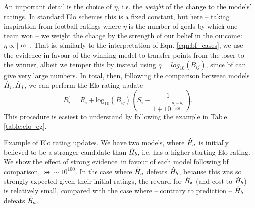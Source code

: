 An important detail is the choice of $\eta$, i.e. the \emph{weight} of the 
    change to the models' ratings. 
In standard Elo schemes this is a fixed constant, 
    but here -- taking inspiration from football ratings where $\eta$ is the number of goals 
    by which one team won -- we weight the change by the strength of our belief in the outcome: 
    $\eta \propto \left| \bij \right|$.
That is, similarly to the interpretation of Eqn. \ref{eqn:bf_cases}, 
    we use the evidence in favour of the winning model to transfer points from the loser to the winner,
    albeit we temper this by instead using $\eta = log_{10}(B_{ij})$, since \gls{bf} can give very large numbers. 
In total, then, following the comparison between models $\hat{H}_i, \hat{H}_j$, we can perform the Elo rating update
\begin{equation}
    \label{eqn:elo_update}
    R_i^{\prime} = R_i + \text{log}_{10}(B_{ij}) \left(S_i - \frac{1}{1 + 10^{\frac{R_j - R_i}{400}}}\right).
\end{equation}
This procedure is easiest to understand by following the example in Table \ref{table:elo_eg}. 

\begin{table}
    \centering
    
    \caption[Example of Elo rating updates.]{
        Example of Elo rating updates. 
        We have two models, where $\hat{H}_a$ is initially believed to be a stronger candidate than $\hat{H}_b$, 
            i.e. has a higher starting Elo rating.     
        We show the effect of strong evidence\footnotemark \ in favour of each model following \gls{bf} comparison, $\bij \sim 10^{100}$. 
        In the case where $\hat{H}_a$ defeats $\hat{H}_b$, because this was so strongly expected given their initial ratings, 
            the reward for $\hat{H}_a$ (and cost to $\hat{H}_b$) is relatively small, 
            compared with the case where -- contrary to prediction -- $\hat{H}_b$ defeats $\hat{H}_a$. 
    }
    \label{table:elo_eg}
\end{table}


